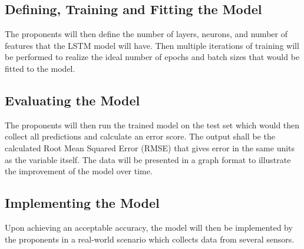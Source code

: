 \documentclass[10pt,11pt,12pt,oneside]{book}
\begin{document}
    \subsection{Defining, Training and Fitting the Model}
    The proponents will then define the number of layers, neurons, and number of features that the LSTM model will have. Then multiple iterations of training will be performed to realize the ideal number of epochs and batch sizes that would be fitted to the model.
    \subsection{Evaluating the Model}
    The proponents will then run the trained model on the test set which would then collect all predictions and calculate an error score. The output shall be the calculated Root Mean Squared Error (RMSE) that gives error in the same units as the variable itself. The data will be presented in a graph format to illustrate the improvement of the model over time.
    \subsection{Implementing the Model}
    Upon achieving an acceptable accuracy, the model will then be implemented by the proponents in a real-world scenario which collects data from several sensors.
    
    
\end{document}
